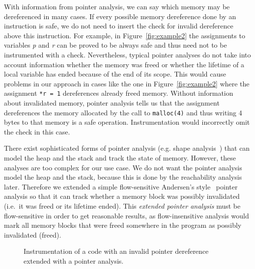 With information from pointer analysis, we can say which memory may be
dereferenced in many cases. If every possible memory dereference done
by an instruction is safe, we do not need to insert the check for
invalid dereference above this instruction. For example, in
Figure~\ref{fig:example2} the assignments to variables \emph{p} and
\emph{r} can be proved to be always safe and thus need not to be
instrumented with a check. Nevertheless, typical pointer analyses do
not take into account information whether the memory was freed or
whether the lifetime of a local variable has ended because of the end
of its scope.  This would cause problems in our approach in cases like
the one in Figure~\ref{fig:example2} where the assignment \texttt{*r =
  1} dereferences already freed memory.  Without information about
invalidated memory, pointer analysis tells us that the assignment
dereferences the memory allocated by the call to \texttt{malloc(4)}
and thus writing 4 bytes to that memory is a safe operation.
Instrumentation would incorrectly omit the check in this case.

There exist sophisticated forms of pointer analysis (e.g. shape
analysis~\cite{Rinetzky2001,Hind01}) that can model the heap and the
stack and track the state of memory.  However, these analyses are too
complex for our use case. We do not want the pointer analysis model
the heap and the stack, because this is done by the reachability
analysis later.  Therefore we extended a simple flow-sensitive
Andersen's style~\cite{and94} pointer analysis so that it can track
whether a memory block was possibly invalidated (i.e.~it was freed or
its lifetime ended).  This \emph{extended pointer analysis} must be
flow-sensitive in order to get reasonable results, as flow-insensitive
analysis would mark all memory blocks that were freed somewhere in the
program as possibly invalidated (freed).

\begin{figure}[t]

\caption{Instrumentation of a code with an invalid pointer
  dereference extended with a pointer analysis.}
\label{fig:examplepta}
\end{figure}

